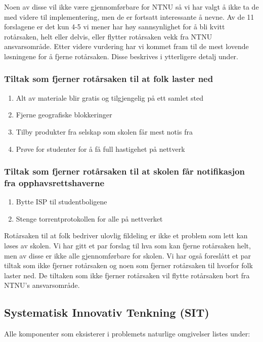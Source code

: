 Noen av disse vil ikke være gjennomførbare for NTNU så vi har valgt å ikke ta de med videre til implementering, men de er fortsatt interessante å nevne. Av de 11 forslagene er det kun 4-5 vi mener har høy sannsynlighet for å bli kvitt rotårsaken, helt eller delvis, eller flytter rotårsaken vekk fra NTNU ansvarsområde. Etter videre vurdering har vi kommet fram til de mest lovende løsningene for å fjerne rotårsaken. Disse beskrives i ytterligere detalj under.

\subsubsection{Tiltak som fjerner rotårsaken til at folk laster ned}

\begin{enumerate}
    \item Alt av materiale blir gratis og tilgjengelig på ett samlet sted
    \item Fjerne geografiske blokkeringer
    \item Tilby produkter fra selskap som skolen får mest notis fra
    \item Prøve for studenter for å få full hastigehet på nettverk
\end{enumerate}

\subsubsection{Tiltak som fjerner rotårsaken til at skolen får notifikasjon fra opphavsrettshaverne}

\begin{enumerate}
    \item Bytte ISP til studentboligene
    \item Stenge torrentprotokollen for alle på nettverket
\end{enumerate}

Rotårsaken til at folk bedriver ulovlig fildeling er ikke et problem som lett kan løses av skolen. Vi har gitt et par forslag til hva som kan fjerne rotårsaken helt, men av disse er ikke alle gjennomførbare for skolen. Vi har også foreslått et par tiltak som ikke fjerner rotårsaken og noen som fjerner rotårsaken til hvorfor folk laster ned. De tiltaken som ikke fjerner rotårsaken vil flytte rotårsaken bort fra NTNU's ansvarsområde.

\subsection{Systematisk Innovativ Tenkning (SIT)}
Alle komponenter som eksisterer i problemets naturlige omgivelser listes under:

